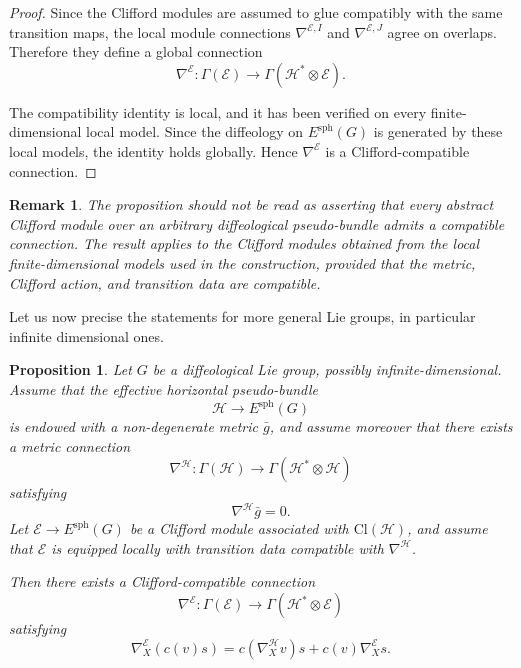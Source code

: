 \documentclass[11pt]{amsart}
\newtheorem{proposition}[theorem]{Proposition}
\newtheorem{remark}[theorem]{Remark}
\begin{document}
\begin{proof}
Since the Clifford modules are assumed to glue compatibly with the same
transition maps, the local module connections
\(\nabla^{\mathcal E,I}\) and \(\nabla^{\mathcal E,J}\) agree on overlaps.
Therefore they define a global connection
\[
\nabla^{\mathcal E}:\Gamma(\mathcal E)
\to
\Gamma(\mathcal H^*\otimes\mathcal E).
\]

The compatibility identity is local, and it has been verified on every
finite-dimensional local model. Since the diffeology on
\(E^{\mathrm{sph}}(G)\) is generated by these local models, the identity
holds globally. Hence \(\nabla^{\mathcal E}\) is a Clifford-compatible
connection.
\end{proof}

\begin{remark}
The proposition should not be read as asserting that every abstract
Clifford module over an arbitrary diffeological pseudo-bundle admits a
compatible connection. The result applies to the Clifford modules obtained
from the local finite-dimensional models used in the construction, provided
that the metric, Clifford action, and transition data are compatible.
\end{remark}
Let us now precise the statements for more general Lie groups, in particular infinite dimensional ones. 
\begin{proposition}
Let \(G\) be a diffeological Lie group, possibly infinite-dimensional.
Assume that the effective horizontal pseudo-bundle
\[
\mathcal H \to E^{\mathrm{sph}}(G)
\]
is endowed with a non-degenerate metric \(\bar g\), and assume moreover that
there exists a metric connection
\[
\nabla^{\mathcal H}:\Gamma(\mathcal H)\to
\Gamma(\mathcal H^*\otimes \mathcal H)
\]
satisfying
\[
\nabla^{\mathcal H}\bar g=0.
\]
Let \(\mathcal E\to E^{\mathrm{sph}}(G)\) be a Clifford module associated with
\(\mathrm{Cl}(\mathcal H)\), and assume that \(\mathcal E\) is equipped locally
with transition data compatible with \(\nabla^{\mathcal H}\).

Then there exists a Clifford-compatible connection
\[
\nabla^{\mathcal E}:\Gamma(\mathcal E)\to
\Gamma(\mathcal H^*\otimes \mathcal E)
\]
satisfying
\[
\nabla^{\mathcal E}_X(c(v)s)
=
c(\nabla^{\mathcal H}_Xv)s
+
c(v)\nabla^{\mathcal E}_Xs.
\]
\end{proposition}
\end{document}
